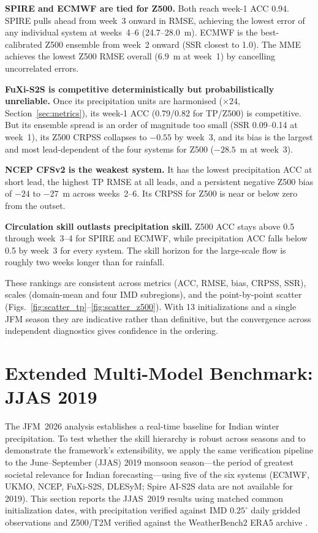 \documentclass[11pt,a4paper]{article}
\begin{document}
\textbf{SPIRE and ECMWF are tied for Z500.} Both reach week-1 ACC 0.94.
SPIRE pulls ahead from week~3 onward in RMSE, achieving the lowest error
of any individual system at weeks~4--6 (24.7--28.0~m). ECMWF is the
best-calibrated Z500 ensemble from week~2 onward (SSR closest to 1.0).
The MME achieves the lowest Z500 RMSE overall (6.9~m at week~1) by
cancelling uncorrelated errors.

\textbf{FuXi-S2S is competitive deterministically but probabilistically
unreliable.} Once its precipitation units are harmonised ($\times24$,
Section~\ref{sec:metrics}), its week-1 ACC (0.79/0.82 for TP/Z500) is
competitive. But its ensemble spread is an order of magnitude too small
(SSR 0.09--0.14 at week~1), its Z500 CRPSS collapses to $-0.55$ by
week~3, and its bias is the largest and most lead-dependent of the four
systems for Z500 ($-28.5$~m at week~3).

\textbf{NCEP CFSv2 is the weakest system.} It has the lowest
precipitation ACC at short lead, the highest TP RMSE at all leads, and
a persistent negative Z500 bias of $-24$ to $-27$~m across weeks~2--6.
Its CRPSS for Z500 is near or below zero from the outset.

\textbf{Circulation skill outlasts precipitation skill.} Z500 ACC stays
above 0.5 through week~3--4 for SPIRE and ECMWF, while precipitation
ACC falls below 0.5 by week~3 for every system. The skill horizon for
the large-scale flow is roughly two weeks longer than for rainfall.

These rankings are consistent across metrics (ACC, RMSE, bias, CRPSS,
SSR), scales (domain-mean and four IMD subregions), and the
point-by-point scatter (Figs.~\ref{fig:scatter_tp}--\ref{fig:scatter_z500}). With 13
initializations and a single JFM season they are indicative rather than
definitive, but the convergence across independent diagnostics gives
confidence in the ordering.


\section{Extended Multi-Model Benchmark: JJAS 2019}\label{sec:jjas2019}

The JFM~2026 analysis establishes a real-time baseline for Indian winter
precipitation. To test whether the skill hierarchy is robust across seasons
and to demonstrate the framework's extensibility, we apply the same verification
pipeline to the June--September (JJAS) 2019 monsoon season---the period of
greatest societal relevance for Indian forecasting---using five of the six systems
(ECMWF, UKMO, NCEP, FuXi-S2S, DLESyM; Spire AI-S2S data are not available
for 2019). This section reports the JJAS~2019 results using matched common
initialization dates, with precipitation verified against IMD $0.25^\circ$
daily gridded observations \citep{pai2014} and Z500/T2M verified against
the WeatherBench2 ERA5 archive \citep{rasp2024}.
\end{document}
